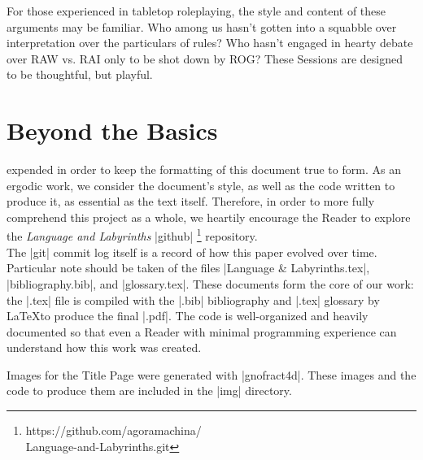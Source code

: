 \documentclass[10pt,twoside,twocolumn,openany,nomultitoc]{book}
\begin{document}
    For those experienced in tabletop roleplaying, the style and content of these arguments may be familiar. Who among us hasn't gotten into a squabble over interpretation over the particulars of rules? Who hasn't engaged in hearty debate over RAW vs. RAI only to be shot down by ROG? These Sessions are designed to be thoughtful, but playful. 

    
    

 \section{Beyond the Basics}
    expended in order to keep the formatting of this document true to form. As an ergodic work, we consider the document's style, as well as the code written to produce it, as essential as the text itself. Therefore, in order to more fully comprehend this project as a whole, we heartily encourage the Reader to explore the \textit{Language and Labyrinths} |github| \footnote{https://github.com/agoramachina/\\\hspace{6pt}Language-and-Labyrinths.git} repository. \\

The |git| commit log itself is a record of how this paper evolved over time.  Particular note should be taken of the files |Language & Labyrinths.tex|, |bibliography.bib|, and |glossary.tex|. These documents form the core of our work: the |.tex| file is compiled with the |.bib| bibliography and |.tex| glossary by \LaTeX to produce the final |.pdf|. The code is well-organized and heavily documented so that even a Reader with minimal programming experience can understand how this work was created. \\\vspace{12pt}

Images for the Title Page were generated with |gnofract4d|. These images and the code to produce them are included in the |img| directory. 
\end{document}

